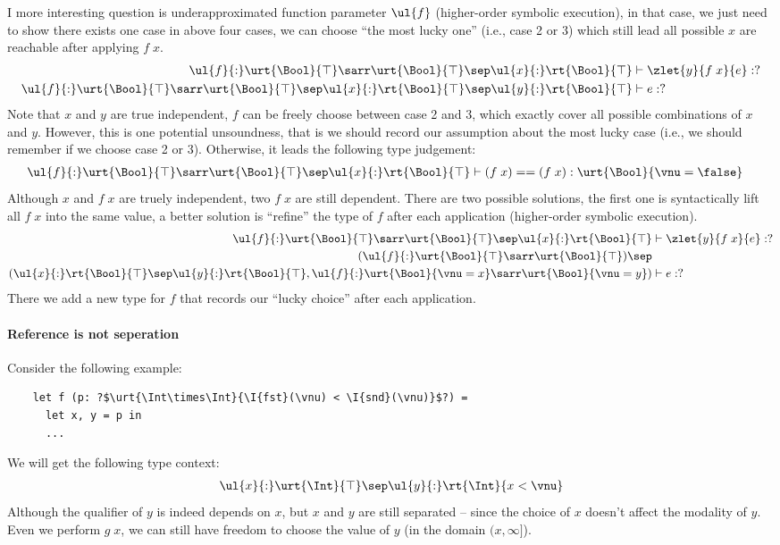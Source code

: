 I more interesting question is underapproximated function parameter $\ul{f}$ (higher-order symbolic execution), in that case, we just need to show there exists one case in above four cases, we can choose ``the most lucky one'' (i.e., case 2 or 3) which still lead all possible $x$ are reachable after applying $f\;x$.
\begin{align*}
    \ul{f}{:}\urt{\Bool}{\top}\sarr\urt{\Bool}{\top} \sep \ul{x}{:}\rt{\Bool}{\top} &\vdash \zlet{y}{f\;x}{e} : ?
    \\ \ul{f}{:}\urt{\Bool}{\top}\sarr\urt{\Bool}{\top} \sep \ul{x}{:}\rt{\Bool}{\top} \sep \ul{y}{:}\rt{\Bool}{\top} &\vdash e : ?
\end{align*}\noindent
Note that $x$ and $y$ are true independent, $f$ can be freely choose between case 2 and 3, which exactly cover all possible combinations of $x$ and $y$.
However, this is one potential unsoundness, that is we should record our assumption about the most lucky case (i.e., we should remember if we choose case 2 or 3). Otherwise, it leads the following type judgement:
\begin{align*}
    \ul{f}{:}\urt{\Bool}{\top}\sarr\urt{\Bool}{\top} \sep \ul{x}{:}\rt{\Bool}{\top} &\vdash (f\;x) == (f\;x) : \urt{\Bool}{\vnu = \false}
\end{align*}\noindent
Although $x$ and $f\;x$ are truely independent, two $f\;x$ are still dependent. There are two possible solutions, the first one is syntactically lift all $f\;x$ into the same value, a better solution is ``refine'' the type of $f$ after each application (higher-order symbolic execution).
\begin{align*}
    \ul{f}{:}\urt{\Bool}{\top}\sarr\urt{\Bool}{\top} \sep \ul{x}{:}\rt{\Bool}{\top} &\vdash \zlet{y}{f\;x}{e} : ?
    \\ (\ul{f}{:}\urt{\Bool}{\top}\sarr\urt{\Bool}{\top}) \sep &
    \\ (\ul{x}{:}\rt{\Bool}{\top} \sep \ul{y}{:}\rt{\Bool}{\top}, \ul{f}{:}\urt{\Bool}{\vnu = x}\sarr\urt{\Bool}{\vnu = y})   &\vdash e : ?
\end{align*}\noindent
There we add a new type for $f$ that records our ``lucky choice'' after each application.

\paragraph{Reference is not seperation} Consider the following example:
\begin{verbatim}
    let f (p: ?$\urt{\Int\times\Int}{\I{fst}(\vnu) < \I{snd}(\vnu)}$?) =
      let x, y = p in
      ...
\end{verbatim}
We will get the following type context:
\begin{align*}
    \ul{x}{:}\urt{\Int}{\top} \sep \ul{y}{:}\rt{\Int}{x < \vnu}
\end{align*}\noindent
Although the qualifier of $y$ is indeed depends on $x$, but $x$ and $y$ are still separated -- since the choice of $x$ doesn't affect the modality of $y$. Even we perform $g\;x$, we can still have freedom to choose the value of $y$ (in the domain $(x, \infty]$).

